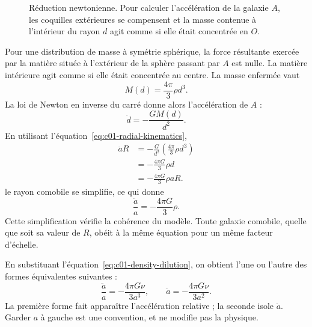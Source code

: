 \begin{figure}[ht]\centering
{}\caption{Réduction newtonienne. Pour calculer l’accélération de la galaxie \(A\), les coquilles extérieures se compensent et la masse contenue à l’intérieur du rayon \(d\) agit comme si elle était concentrée en \(O\).}\label{fig:c01-newton-sphere}\end{figure}

Pour une distribution de masse à symétrie sphérique, la force résultante exercée par la matière située à l’extérieur de la sphère passant par \(A\) est nulle. La matière intérieure agit comme si elle était concentrée au centre. La masse enfermée vaut
\begin{equation}
M(d)=\frac{4\pi}{3}\rho d^3.
\label{eq:c01-enclosed-mass}
\end{equation}
La loi de Newton en inverse du carré donne alors l’accélération de \(A\) :
\begin{equation}
\ddot d=-\frac{GM(d)}{d^2}.
\end{equation}
En utilisant l’équation~\eqref{eq:c01-radial-kinematics},
\begin{align}
\ddot a R
&=-\frac{G}{d^2}\left(\frac{4\pi}{3}\rho d^3\right) \\
&=-\frac{4\pi G}{3}\rho d \\
&=-\frac{4\pi G}{3}\rho aR.
\end{align}
le rayon comobile se simplifie, ce qui donne
\begin{equation}
\boxed{\frac{\ddot a}{a}=-\frac{4\pi G}{3}\rho.}
\label{eq:c01-acceleration}
\end{equation}
Cette simplification vérifie la cohérence du modèle. Toute galaxie comobile, quelle que soit sa valeur de \(R\), obéit à la même équation pour un même facteur d’échelle.

En substituant l’équation~\eqref{eq:c01-density-dilution}, on obtient l’une ou l’autre des formes équivalentes suivantes :
\begin{equation}
\frac{\ddot a}{a}=-\frac{4\pi G\nu}{3a^3},
\qquad
\ddot a=-\frac{4\pi G\nu}{3a^2}.
\label{eq:c01-acceleration-nu}
\end{equation}
La première forme fait apparaître l’accélération relative ; la seconde isole \(\ddot a\). Garder \(a\) à gauche est une convention, et ne modifie pas la physique.

